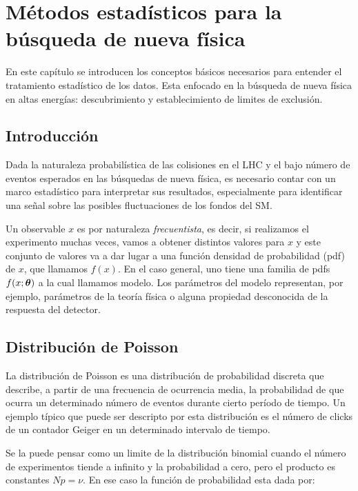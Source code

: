 \chapter{Métodos estadísticos para la búsqueda de nueva física}

En este capítulo se introducen los conceptos básicos necesarios para entender el
tratamiento estadístico de los datos. Esta enfocado en la búsqueda de nueva
física en altas energías: descubrimiento y establecimiento de limites de
exclusión.


\section{Introducción} %

Dada la naturaleza probabilística de las colisiones en el LHC y el bajo número
de eventos esperados en las búsquedas de nueva física, es necesario contar con
un marco estadístico para interpretar sus resultados, especialmente para
identificar una señal sobre las posibles fluctuaciones de los fondos del SM.

Un observable $x$ es por naturaleza \emph{frecuentista}, es decir, si realizamos
el experimento muchas veces, vamos a obtener distintos valores para $x$ y este
conjunto de valores va a dar lugar a una función densidad de probabilidad (pdf)
de $x$, que llamamos $f(x)$. En el caso general, uno tiene una familia de pdfs
$f(x;\bm{\theta})$ a la cual llamamos modelo. Los parámetros del modelo representan,
por ejemplo, parámetros de la teoría física o alguna propiedad desconocida de la
respuesta del detector.


\section{Distribución de Poisson}
La distribución de Poisson es una distribución de probabilidad discreta que
describe, a partir de una frecuencia de ocurrencia media, la probabilidad de que
ocurra un determinado número de eventos durante cierto período de tiempo. Un
ejemplo típico que puede ser descripto por esta distribución es el número de
clicks de un contador Geiger en un determinado intervalo de tiempo.

Se la puede pensar como un limite de la distribución binomial cuando el número
de experimentos tiende a infinito y la probabilidad a cero, pero el producto es
constantes $Np = \nu$. En ese caso la función de probabilidad esta dada por:

